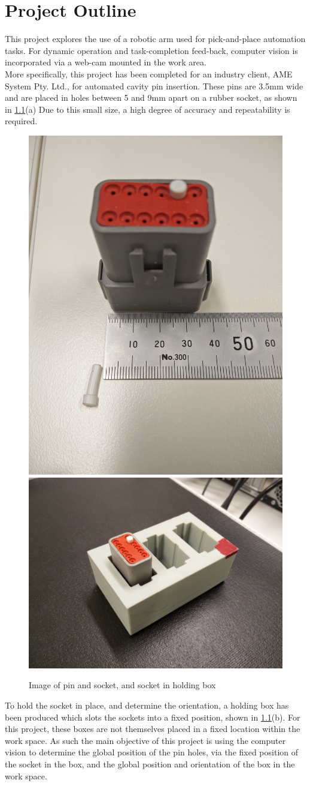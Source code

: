 \documentclass[11pt,a4paper]{report}
\begin{document}
\chapter{Project Outline}
This project explores the use of a robotic arm used for pick-and-place automation tasks. For dynamic operation and task-completion feed-back, computer vision is incorporated via a web-cam mounted in the work area.\\
More specifically, this project has been completed for an industry client, AME System Pty. Ltd., for automated cavity pin insertion. These pins are 3.5mm wide and are placed in holes between 5 and 9mm apart on a rubber socket, as shown in \cref{fig:IMG_20160908_142218}(a) Due to this small size, a high degree of accuracy and repeatability is required.\\
\begin{figure}[h]
\centering
\includegraphics[width=0.25\linewidth]{IMG_20160908_142218} %
\includegraphics[width=0.45\linewidth]{IMG_20160912_135721}
\caption{Image of pin and socket, and socket in holding box}
\label{fig:IMG_20160908_142218}
\end{figure}
To hold the socket in place, and determine the orientation, a holding box has been produced which slots the sockets into a fixed position, shown in \cref{fig:IMG_20160908_142218}(b). For this project, these boxes are not themselves placed in a fixed location within the work space. As such the main objective of this project is using the computer vision to determine the global position of the pin holes, via the fixed position of the socket in the box, and the global position and orientation of the box in the work space.\\
\end{document}
